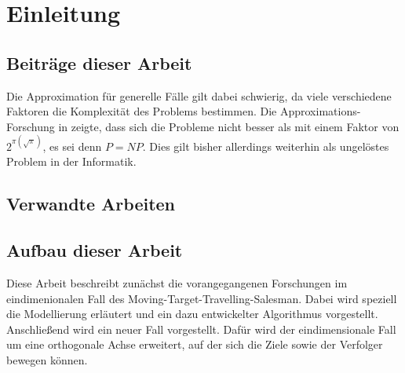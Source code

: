 \documentclass[german,version-2019-11]{uzl-thesis}
\begin{document}
\chapter{Einleitung}



\section{Beiträge dieser Arbeit}

Die Approximation für generelle Fälle gilt dabei schwierig, da viele verschiedene Faktoren die Komplexität des Problems bestimmen. Die Approximations-Forschung in \cite{hammar} zeigte, dass sich die Probleme nicht besser als mit einem Faktor von $2^{\pi(\sqrt{\pi})}$, es sei denn $P=NP$. Dies gilt bisher allerdings weiterhin als ungelöstes Problem in der Informatik.


\section{Verwandte Arbeiten}



\section{Aufbau dieser Arbeit}
Diese Arbeit beschreibt zunächst die vorangegangenen Forschungen im eindimenionalen Fall des Moving-Target-Travelling-Salesman. Dabei wird speziell die Modellierung erläutert und ein dazu entwickelter Algorithmus vorgestellt. Anschließend wird ein neuer Fall vorgestellt. Dafür wird der eindimensionale Fall um eine orthogonale Achse erweitert, auf der sich die Ziele sowie der Verfolger bewegen können. 
\end{document}
